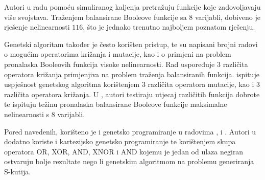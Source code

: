 Autori u radu \cite{EvolvingBoolean} pomoću simuliranog kaljenja  \cite{SimulatedAnnealing} pretražuju funkcije koje zadovoljavaju više svojstava.
Traženjem balansirane Booleove funkcije sa 8 varijabli, dobiveno je rješenje nelinearnosti $116$, što je jednako trenutno najboljem poznatom rješenju.

Genetski algoritam \cite{holland1992adaptation} također je često korišten pristup, te su napisani brojni radovi o mogućim operatorima križanja i mutacije, kao i o primjeni na problem pronalaska Booleovih funkcija visoke nelinearnosti.
Rad \cite{manzoni2019balanced} uspoređuje $3$ različita operatora križanja primjenjiva na problem traženja balansiranih funkcija.
\cite{picek2014using} ispituje uspješnost genetskog algoritma korištenjem $3$ različita operatora mutacije, kao i $3$ različita operatora križanja.
U \cite{MaximalNonlinearity}, autori testiraju utjecaj različitih funkcija dobrote te ispituju težinu pronalaska balansirane Booleove funkcije maksimalne nelinearnosti s 8 varijabli.

Pored navedenih, korišteno je i genetsko programiranje \cite{koza1992genetic} u radovima \cite{picek2015cartesian}, \cite{picek2013evolving} i \cite{tesavr2010new}.
Autori u \cite{picek2015cartesian} dodatno koriste i kartezijsko genetsko programiranje te korištenjem skupa operatora OR, XOR, AND, XNOR i AND kojemu je jedan od ulaza negiran ostvaruju bolje rezultate nego li genetskim algoritmom na problemu generiranja S-kutija. 
